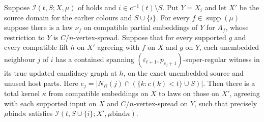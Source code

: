 \begin{lemma}
Suppose $\mathcal I(t,S;X,\mu)$ of 
holds and $i\in c^{-1}(t)\setminus S$. Put $Y=X_i$ and let $X'$ be
the source domain for the earlier colours and $S\cup\{i\}$.
For every $f\in\operatorname{supp}(\mu)$ suppose there is a law
$\nu_f$ on compatible partial embeddings of $Y$ for $A_f$, whose
restriction to $Y$ is $C/n$-vertex-spread. Suppose that for every
supported $g$ and every compatible lift $h$ on $X'$ agreeing with $f$
on $X$ and $g$ on $Y$, each unembedded neighbour $j$ of $i$ has a
contained spanning $(\varepsilon_{t+1},p_{e_j+1})$-super-regular
witness in its true updated candidacy graph at $h$, on the exact
unembedded source and unused host parts. Here
$e_j=|N_R(j)\cap(\{k:c(k)<t\}\cup S)|$.
Then there is a total kernel $\kappa$ from compatible embeddings on
$X$ to laws on those on $X'$, agreeing with each supported input on
$X$ and $C/n$-vertex-spread on $Y$, such that precisely
$\mu\mathbin{\mathrm{bind}}\kappa$ satisfies
$\mathcal I(t,S\cup\{i\};X',\mu\mathbin{\mathrm{bind}}\kappa)$.
\end{lemma}
